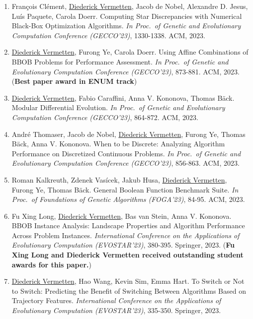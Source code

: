 \begin{enumerate}
    \item François Clément, \underline{Diederick Vermetten}, Jacob de Nobel, Alexandre D. Jesus, Luís Paquete, Carola Doerr. Computing Star Discrepancies with Numerical Black-Box Optimization Algorithms. 
    \emph{In Proc.~of Genetic and Evolutionary Computation Conference (GECCO'23)}, 1330-1338. ACM, 2023.

    \item \underline{Diederick Vermetten}, Furong Ye, Carola Doerr. Using Affine Combinations of BBOB Problems for Performance Assessment. 
    \emph{In Proc.~of Genetic and Evolutionary Computation Conference (GECCO'23)}, 873-881. ACM, 2023. (\textbf{Best paper award in ENUM track})

   \item 	\underline{Diederick Vermetten}, Fabio Caraffini, Anna V. Kononova, Thomas Bäck. Modular Differential Evolution.
    \emph{In Proc.~of Genetic and Evolutionary Computation Conference (GECCO'23)}, 864-872. ACM, 2023.

    \item André Thomaser, Jacob de Nobel, \underline{Diederick Vermetten}, Furong Ye, Thomas Bäck, Anna V. Kononova. When to be Discrete: Analyzing Algorithm Performance on Discretized Continuous Problems. 
    \emph{In Proc.~of Genetic and Evolutionary Computation Conference (GECCO'23)}, 856-863. ACM, 2023.

    \item Roman Kalkreuth, Zdenek Vasícek, Jakub Husa, \underline{Diederick Vermetten}, Furong Ye, Thomas Bäck. General Boolean Function Benchmark Suite. 
    \emph{In Proc.~of Foundations of Genetic Algorithms (FOGA'23)}, 84-95. ACM, 2023.

    \item Fu Xing Long, \underline{Diederick Vermetten}, Bas van Stein, Anna V. Kononova. BBOB Instance Analysis: Landscape Properties and Algorithm Performance Across Problem Instances.
    \emph{International Conference on the Applications of Evolutionary Computation (EVOSTAR'23)}, 380-395. Springer, 2023. (\textbf{Fu Xing Long and Diederick Vermetten received outstanding student awards for this paper.})

    \item \underline{Diederick Vermetten}, Hao Wang, Kevin Sim, Emma Hart. To Switch or Not to Switch: Predicting the Benefit of Switching Between Algorithms Based on Trajectory Features. 
    \emph{International Conference on the Applications of Evolutionary Computation (EVOSTAR'23)}, 335-350. Springer, 2023.


\end{enumerate}
